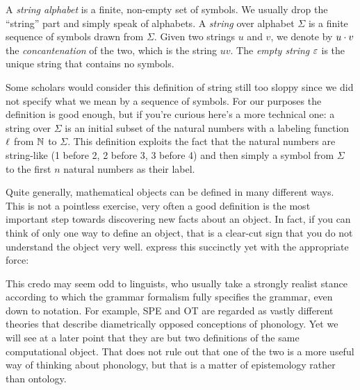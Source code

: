 \begin{definition}[Strings]
    A \emph{string alphabet} is a finite, non-empty set of symbols.
    We usually drop the ``string'' part and simply speak of alphabets.
    A \emph{string} over alphabet $\Sigma$ is a finite sequence of symbols drawn from $\Sigma$.
    Given two strings $u$ and $v$, we denote by $u \cdot v$ the \emph{concantenation} of the two, which is the string $uv$.
    The \emph{empty string} $\varepsilon$ is the unique string that contains no symbols.
\end{definition}
%
Some scholars would consider this definition of string still too sloppy since we did not specify what we mean by a sequence of symbols.
For our purposes the definition is good enough, but if you're curious here's a more technical one: a string over $\Sigma$ is an initial subset of the natural numbers with a labeling function $\ell$ from $\mathbb{N}$ to $\Sigma$.
This definition exploits the fact that the natural numbers are string-like (1 before 2, 2 before 3, 3 before 4) and then simply a symbol from $\Sigma$ to the first $n$ natural numbers as their label.

Quite generally, mathematical objects can be defined in many different ways.
This is not a pointless exercise, very often a good definition is the most important step towards discovering new facts about an object.
In fact, if you can think of only one way to define an object, that is a clear-cut sign that you do not understand the object very well.
\citet[10]{KeenanMoss12} express this succinctly yet with the appropriate force:
%
\begin{center}
\end{center}

This credo may seem odd to linguists, who usually take a strongly realist stance according to which the grammar formalism fully specifies the grammar, even down to notation.
For example, SPE and OT are regarded as vastly different theories that describe diametrically opposed conceptions of phonology.
Yet we will see at a later point that they are but two definitions of the same computational object.
That does not rule out that one of the two is a more useful way of thinking about phonology, but that is a matter of epistemology rather than ontology.

